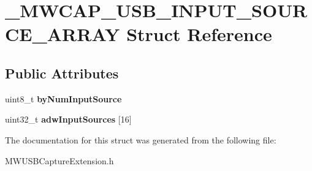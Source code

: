 \hypertarget{struct__MWCAP__USB__INPUT__SOURCE__ARRAY}{\section{\-\_\-\-M\-W\-C\-A\-P\-\_\-\-U\-S\-B\-\_\-\-I\-N\-P\-U\-T\-\_\-\-S\-O\-U\-R\-C\-E\-\_\-\-A\-R\-R\-A\-Y Struct Reference}
\label{struct__MWCAP__USB__INPUT__SOURCE__ARRAY}
}
\subsection*{Public Attributes}
\begin{DoxyCompactItemize}
\item 
\hypertarget{struct__MWCAP__USB__INPUT__SOURCE__ARRAY_a33fb713756296ee60aa965f6808b962c}{uint8\-\_\-t {\bfseries by\-Num\-Input\-Source}}\label{struct__MWCAP__USB__INPUT__SOURCE__ARRAY_a33fb713756296ee60aa965f6808b962c}

\item 
\hypertarget{struct__MWCAP__USB__INPUT__SOURCE__ARRAY_af60c63e3e3a966842faa69a9ea54c40d}{uint32\-\_\-t {\bfseries adw\-Input\-Sources} \mbox{[}16\mbox{]}}\label{struct__MWCAP__USB__INPUT__SOURCE__ARRAY_af60c63e3e3a966842faa69a9ea54c40d}

\end{DoxyCompactItemize}


The documentation for this struct was generated from the following file\-:\begin{DoxyCompactItemize}
\item 
M\-W\-U\-S\-B\-Capture\-Extension.\-h\end{DoxyCompactItemize}
